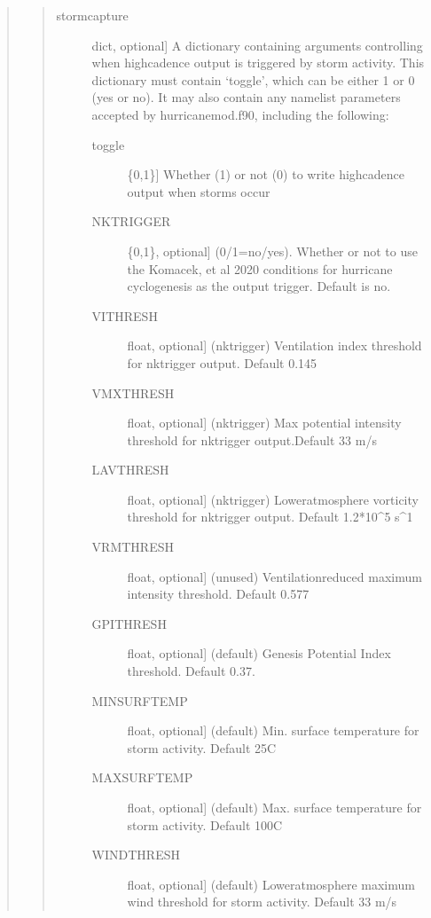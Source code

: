 \documentclass[letterpaper,10pt,english]{sphinxmanual}
\begin{document}
\begin{fulllineitems}
\begin{fulllineitems}
\begin{quote}
\begin{quote}
\begin{description}
\begin{description}
\item[{stormcapture}] \leavevmode{[}dict, optional{]}
A dictionary containing arguments controlling when high\sphinxhyphen{}cadence output
is triggered by storm activity. This dictionary must contain ‘toggle’, which
can be either 1 or 0 (yes or no). It may also contain any namelist
parameters accepted by hurricanemod.f90, including the following:
\begin{description}
\item[{toggle}] \leavevmode{[}\{0,1\}{]}
Whether (1) or not (0) to write high\sphinxhyphen{}cadence output when storms occur

\item[{NKTRIGGER}] \leavevmode{[}\{0,1\}, optional{]}
(0/1=no/yes). Whether or not to use the Komacek, et al 2020 conditions for hurricane cyclogenesis as the output trigger. Default is no.

\item[{VITHRESH}] \leavevmode{[}float, optional{]}
(nktrigger) Ventilation index threshold for nktrigger output. Default 0.145

\item[{VMXTHRESH}] \leavevmode{[}float, optional{]}
(nktrigger) Max potential intensity threshold for nktrigger output.Default 33 m/s

\item[{LAVTHRESH}] \leavevmode{[}float, optional{]}
(nktrigger) Lower\sphinxhyphen{}atmosphere vorticity threshold for nktrigger output. Default 1.2*10\textasciicircum{}\sphinxhyphen{}5 s\textasciicircum{}\sphinxhyphen{}1

\item[{VRMTHRESH}] \leavevmode{[}float, optional{]}
(unused) Ventilation\sphinxhyphen{}reduced maximum intensity threshold. Default 0.577

\item[{GPITHRESH}] \leavevmode{[}float, optional{]}
(default) Genesis Potential Index threshold. Default 0.37.

\item[{MINSURFTEMP}] \leavevmode{[}float, optional{]}
(default) Min. surface temperature for storm activity. Default 25C

\item[{MAXSURFTEMP}] \leavevmode{[}float, optional{]}
(default) Max. surface temperature for storm activity. Default 100C

\item[{WINDTHRESH}] \leavevmode{[}float, optional{]}
(default) Lower\sphinxhyphen{}atmosphere maximum wind threshold for storm activity.  Default 33 m/s


\end{description}
\end{description}
\end{description}
\end{quote}
\end{quote}
\end{fulllineitems}
\end{fulllineitems}
\end{document}
